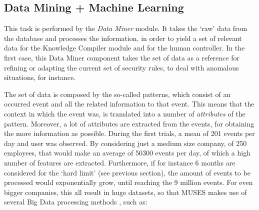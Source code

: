 %
\subsection{Data Mining + Machine Learning}
\label{subsubsec:dm_ml}

This task is performed by the \textit{Data Miner} module. It  takes the `raw' data from the database and processes the information, in order to yield a set of relevant data for the Knowledge Compiler module and for the human controller. In the first case, this Data Miner component takes the set of data as a reference for refining or adapting the current set of security rules, to deal with anomalous situations, for instance.

The set of data is composed by the so-called patterns, which consist of an occurred event and all the related information to that event. This means that the context in which the event was, is translated into a number of \textit{attributes} of the pattern. Moreover, a lot of attributes are extracted from the events, for obtaining the more information as possible. 
During the first trials, a mean of 201 events per day and user was observed. By considering just a medium size company, of 250 employees, that would make an average of 50300 events per day, of which a high number of features are extracted. Furthermore, if for instance 6 months are considered for the `hard limit' (see previous section), the amount of events to be processed would exponentially grow, until reaching the 9 million events. For even bigger companies, this all result in huge datasets, so that MUSES makes use of several Big Data processing methods \cite{BigData_11}, such as: 

